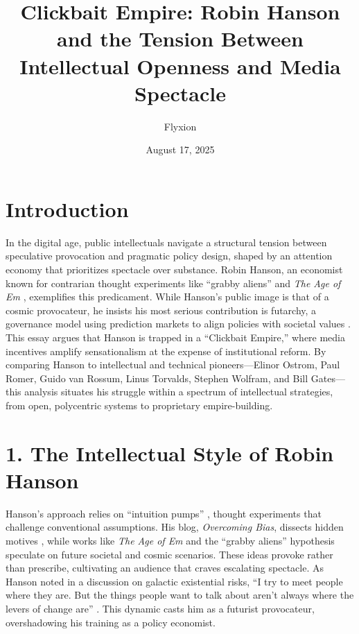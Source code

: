 \documentclass[11pt]{article}
\begin{document}
\title{\textbf{Clickbait Empire: Robin Hanson and the Tension Between Intellectual Openness and Media Spectacle}}
\author{Flyxion}
\date{August 17, 2025}
\maketitle

\section*{Introduction}

In the digital age, public intellectuals navigate a structural tension between speculative provocation and pragmatic policy design, shaped by an attention economy that prioritizes spectacle over substance. Robin Hanson, an economist known for contrarian thought experiments like ``grabby aliens'' \citep{hanson2021a} and \emph{The Age of Em} \citep{hanson2016}, exemplifies this predicament. While Hanson’s public image is that of a cosmic provocateur, he insists his most serious contribution is futarchy, a governance model using prediction markets to align policies with societal values \citep{Hanson2013-HANSWV,ash2021c}. This essay argues that Hanson is trapped in a ``Clickbait Empire,'' where media incentives amplify sensationalism at the expense of institutional reform. By comparing Hanson to intellectual and technical pioneers---Elinor Ostrom, Paul Romer, Guido van Rossum, Linus Torvalds, Stephen Wolfram, and Bill Gates---this analysis situates his struggle within a spectrum of intellectual strategies, from open, polycentric systems to proprietary empire-building.

\section*{1. The Intellectual Style of Robin Hanson}

Hanson’s approach relies on ``intuition pumps'' \citep{dennett1984}, thought experiments that challenge conventional assumptions. His blog, \emph{Overcoming Bias}, dissects hidden motives \citep{hanson2022}, while works like \emph{The Age of Em} \citep{hanson2016} and the ``grabby aliens'' hypothesis \citep{hanson2021a} speculate on future societal and cosmic scenarios. These ideas provoke rather than prescribe, cultivating an audience that craves escalating spectacle. As Hanson noted in a discussion on galactic existential risks, ``I try to meet people where they are. But the things people want to talk about aren’t always where the levers of change are'' \citep{hansonstone2025}. This dynamic casts him as a futurist provocateur, overshadowing his training as a policy economist.
\end{document}
